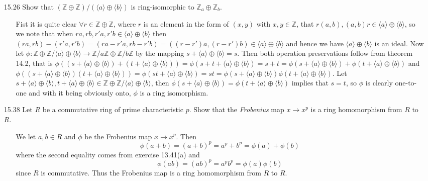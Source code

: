 \documentclass[12pt]{article}
\begin{document}
\begin{enumerate}
\item[15.26] Show that $(\mathbb{Z} \oplus \mathbb{Z})/(\langle a\rangle \oplus \langle b
\rangle )$ is ring-isomorphic to $\mathbb{Z}_a \oplus \mathbb{Z}_b$.
\begin{enumerate}
\item[] Fist it is quite clear $\forall r \in \mathbb{Z} \oplus \mathbb{Z}$, where $r$ is an element
in the form of $(x, y)$ with $x, y \in \mathbb{Z}$, that $r(a, b), 
(a, b)r \in \langle a\rangle \oplus \langle b\rangle$, so we note
that when $ra, rb, r'a, r'b \in \langle a\rangle \oplus \langle b\rangle$ then 
$(ra, rb) - (r'a, r'b) = (ra - r'a, rb - r'b) = ((r - r')a, (r - r')b) \in \langle a\rangle \oplus \langle b\rangle$ and
hence we have $\langle a\rangle \oplus \langle b\rangle$ is an ideal. Now 
let $\phi: \mathbb{Z} \oplus \mathbb{Z}/\langle a\rangle \oplus \langle b\rangle \rightarrow \mathbb{Z}/a\mathbb{Z} 
\oplus \mathbb{Z}/b\mathbb{Z}$ by the mapping $s + \langle a\rangle \oplus \langle b\rangle = s$. Then both 
operation preservations follow from theorem 14.2, that is $\phi((s + \langle a\rangle \oplus \langle b\rangle) + 
(t + \langle a\rangle \oplus \langle b\rangle)) = \phi(s + t + \langle a\rangle \oplus \langle b\rangle) =
s + t = \phi(s + \langle a\rangle \oplus \langle b\rangle) + \phi(t + \langle a\rangle \oplus \langle b\rangle)$ and
$\phi((s + \langle a\rangle \oplus \langle b\rangle)(t + \langle a\rangle \oplus \langle b\rangle)) = 
\phi(st + \langle a\rangle \oplus \langle b\rangle) = st = \phi(s + \langle a\rangle \oplus \langle b\rangle)
\phi(t + \langle a\rangle \oplus \langle b\rangle)$. Let $s + \langle a\rangle \oplus \langle b\rangle, t +
\langle a\rangle \oplus \langle b\rangle \in \mathbb{Z} \oplus \mathbb{Z}/\langle a\rangle \oplus \langle b\rangle$, then
$\phi(s + \langle a\rangle \oplus \langle b\rangle) = \phi(t + \langle a\rangle \oplus \langle b\rangle)$
implies that $s = t$, so $\phi$ is clearly one-to-one and with it being obviously onto, $\phi$ is a ring isomorphism.
\end{enumerate}

\item[15.38] Let $R$ be a commutative ring of prime characteristic $p$. Show that the
\emph{Frobenius} map $x \rightarrow x^p$ is a ring homomorphism from $R$ to $R$.
\begin{enumerate}
\item[] We let $a, b \in R$ and $\phi$ be the Frobenius map $x \rightarrow x^p$. Then 
\[ 
\phi(a + b) = (a + b)^p = a^p + b^p = \phi(a) + \phi(b)
\]
where the second equality comes from exercise 13.41(a) and
\[
\phi(ab) = (ab)^p = a^pb^p = \phi(a)\phi(b)
\]
since $R$ is commutative. Thus the Frobenius map is a ring homomorphism from $R$ to $R$.
\end{enumerate}



\end{enumerate}
\end{document}
